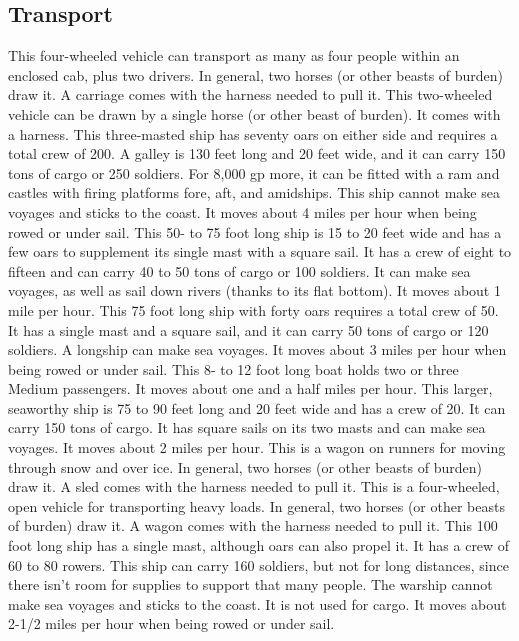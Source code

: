     \subsection{Transport}
         This four-wheeled vehicle can transport as many as four people within an enclosed cab, plus two drivers. In general, two horses (or other beasts of burden) draw it. A carriage comes with the harness needed to pull it.
         This two-wheeled vehicle can be drawn by a single horse (or other beast of burden). It comes with a harness.
         This three-masted ship has seventy oars on either side and requires a total crew of 200. A galley is 130 feet long and 20 feet wide, and it can carry 150 tons of cargo or 250 soldiers. For 8,000 gp more, it can be fitted with a ram and castles with firing platforms fore, aft, and amidships. This ship cannot make sea voyages and sticks to the coast. It moves about 4 miles per hour when being rowed or under sail.
         This 50- to 75 foot long ship is 15 to 20 feet wide and has a few oars to supplement its single mast with a square sail. It has a crew of eight to fifteen and can carry 40 to 50 tons of cargo or 100 soldiers. It can make sea voyages, as well as sail down rivers (thanks to its flat bottom). It moves about 1 mile per hour.
         This 75 foot long ship with forty oars requires a total crew of 50. It has a single mast and a square sail, and it can carry 50 tons of cargo or 120 soldiers. A longship can make sea voyages. It moves about 3 miles per hour when being rowed or under sail.
         This 8- to 12 foot long boat holds two or three Medium passengers. It moves about one and a half miles per hour.
         This larger, seaworthy ship is 75 to 90 feet long and 20 feet wide and has a crew of 20. It can carry 150 tons of cargo. It has square sails on its two masts and can make sea voyages. It moves about 2 miles per hour.
         This is a wagon on runners for moving through snow and over ice. In general, two horses (or other beasts of burden) draw it. A sled comes with the harness needed to pull it.
         This is a four-wheeled, open vehicle for transporting heavy loads. In general, two horses (or other beasts of burden) draw it. A wagon comes with the harness needed to pull it.
         This 100 foot long ship has a single mast, although oars can also propel it. It has a crew of 60 to 80 rowers. This ship can carry 160 soldiers, but not for long distances, since there isn't room for supplies to support that many people. The warship cannot make sea voyages and sticks to the coast. It is not used for cargo. It moves about 2-1/2 miles per hour when being rowed or under sail.

